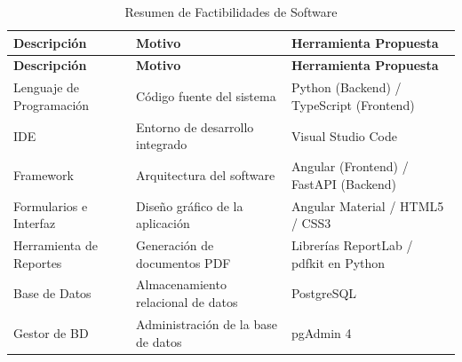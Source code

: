 {
\small
{}
\setlength{\parindent}{0pt}
\begin{xltabular}{\linewidth}{
    >{\raggedright\arraybackslash}p{4.0cm} 
    >{\raggedright\arraybackslash}p{4.0cm} 
    >{\raggedright\arraybackslash}X
}

    \caption{Resumen de Factibilidades de Software} \label{tab:fact_software} \\
    \toprule
    \textbf{Descripción} & \textbf{Motivo} & \textbf{Herramienta Propuesta} \\
    \midrule
    \endfirsthead

    \toprule
    \textbf{Descripción} & \textbf{Motivo} & \textbf{Herramienta Propuesta} \\
    \midrule
    \endhead

    \endfoot

    \bottomrule
\endlastfoot

    Lenguaje de Programación & Código fuente del sistema & Python (Backend) / TypeScript (Frontend) \\
    \addlinespace
    IDE & Entorno de desarrollo integrado & Visual Studio Code \\
    \addlinespace
    Framework & Arquitectura del software & Angular (Frontend) / FastAPI (Backend) \\
    \addlinespace
    Formularios e Interfaz & Diseño gráfico de la aplicación & Angular Material / HTML5 / CSS3 \\
    \addlinespace
    Herramienta de Reportes & Generación de documentos PDF & Librerías ReportLab / pdfkit en Python \\
    \addlinespace
    Base de Datos & Almacenamiento relacional de datos & PostgreSQL \\
    \addlinespace
    Gestor de BD & Administración de la base de datos & pgAdmin 4 \\
\end{xltabular}
}

